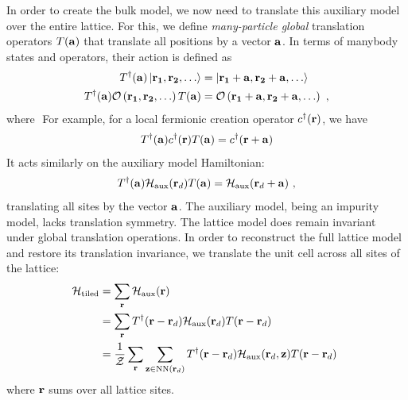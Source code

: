 \documentclass[reprint,hidelinks]{revtex4-2}
\begin{document}
In order to create the bulk model, we now need to translate this auxiliary model over the entire lattice. For this, we define {\it many-particle global} translation operators \(T({\bf a})\) that translate all positions by a vector \({\bf a}\). In terms of manybody states and operators, their action is defined as 
\begin{equation}\begin{aligned}\label{translationDefinition}
	T^\dagger({\bf a}) \ket{\bf r_1, \bf r_2,\ldots} &= \ket{\bf r_1 + a, \bf r_2 + a,\ldots}\\
	T^\dagger({\bf a}) \mathcal{O}\left(\bf r_1, \bf r_2,\ldots\right)T({\bf a}) &= \mathcal{O}\left(\bf r_1 + a, \bf r_2 + a,\ldots\right)~,
\end{aligned}\end{equation}
where \(\)
For example, for a local fermionic creation operator \(c^\dagger({\bf r})\), we have 
\begin{equation}\begin{aligned}
	T^\dagger({\bf a}) c^\dagger({\bf r}) T({\bf a}) = c^\dagger({\bf r} + {\bf a})
\end{aligned}\end{equation}
It acts similarly on the auxiliary model Hamiltonian:
\begin{equation}\begin{aligned}
	T^\dagger({\bf a})\mathcal{H}_\text{aux}({\bf r}_d)T({\bf a}) = \mathcal{H}_\text{aux}({\bf r}_d + {\bf a})~,
\end{aligned}\end{equation}
translating all sites by the vector \({\bf a}\). The auxiliary model, being an impurity model, lacks translation symmetry. The lattice model does remain invariant under global translation operations. In order to reconstruct the full lattice model and restore its translation invariance, we translate the unit cell across all sites of the lattice:
\begin{equation}\begin{aligned}
	\label{tilingPrescription}
	\mathcal{H}_\text{tiled} &= \sum_{{\bf r}}\mathcal{H}_\text{aux}({\bf r})\\
				&= \sum_{{\bf r}}T^\dagger({\bf r} - {\bf r}_d)\mathcal{H}_\text{aux}({\bf r}_d)T({\bf r} - {\bf r}_d)~ \\
				&= \frac{1}{\mathcal{Z}}\sum_{{\bf r}}\sum_{{\bf z}\in\text{NN}({\bf r}_d)}T^\dagger({\bf r} - {\bf r}_d)\mathcal{H}_\text{aux}({\bf r}_d, {\bf z})T({\bf r} - {\bf r}_d)~ \\
\end{aligned}\end{equation}
where \({\bf r}\) sums over all lattice sites.
\end{document}
